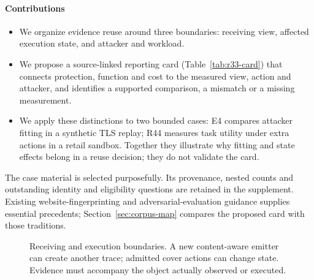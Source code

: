 \paragraph{Contributions}
\begin{itemize}
\item We organize evidence reuse around three boundaries: receiving view, affected execution state, and attacker and workload.
\item We propose a source-linked reporting card (Table~\ref{tab:r33-card}) that connects protection, function and cost to the measured view, action and attacker, and identifies a supported comparison, a mismatch or a missing measurement.
\item We apply these distinctions to two bounded cases: E4 compares attacker fitting in a synthetic TLS replay; R44 measures task utility under extra actions in a retail sandbox. Together they illustrate why fitting and state effects belong in a reuse decision; they do not validate the card.
\end{itemize}
The case material is selected purposefully. Its provenance, nested counts and outstanding identity and eligibility questions are retained in the supplement. Existing website-fingerprinting and adversarial-evaluation guidance supplies essential precedents; Section~\ref{sec:corpus-map} compares the proposed card with those traditions.


\begin{figure}[t]\centering
\caption{Receiving and execution boundaries. A new content-aware emitter can create another trace; admitted cover actions can change state. Evidence must accompany the object actually observed or executed.}\label{fig:system-model}\end{figure}
